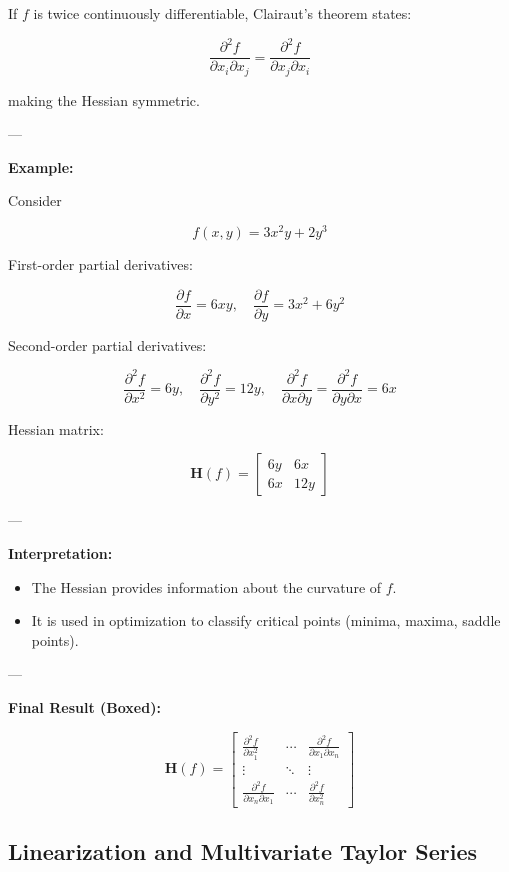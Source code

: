 If \( f \) is twice continuously differentiable, Clairaut's theorem states:

\[
\frac{\partial^2 f}{\partial x_i \partial x_j} = \frac{\partial^2 f}{\partial x_j \partial x_i}
\]

making the Hessian symmetric.

---

\textbf{Example:}

Consider

\[
f(x, y) = 3x^2 y + 2 y^3
\]

First-order partial derivatives:

\[
\frac{\partial f}{\partial x} = 6 x y, \quad \frac{\partial f}{\partial y} = 3 x^2 + 6 y^2
\]

Second-order partial derivatives:

\[
\frac{\partial^2 f}{\partial x^2} = 6 y, \quad \frac{\partial^2 f}{\partial y^2} = 12 y, \quad \frac{\partial^2 f}{\partial x \partial y} = \frac{\partial^2 f}{\partial y \partial x} = 6 x
\]

Hessian matrix:

\[
\mathbf{H}(f) =
\begin{bmatrix}
6 y & 6 x \\
6 x & 12 y
\end{bmatrix}
\]

---

\textbf{Interpretation:}
\begin{itemize}
    \item The Hessian provides information about the curvature of \( f \).
    \item It is used in optimization to classify critical points (minima, maxima, saddle points).
\end{itemize}

---

\textbf{Final Result (Boxed):}

\[
\boxed{
\mathbf{H}(f) =
\begin{bmatrix}
\frac{\partial^2 f}{\partial x_1^2} & \cdots & \frac{\partial^2 f}{\partial x_1 \partial x_n} \\
\vdots & \ddots & \vdots \\
\frac{\partial^2 f}{\partial x_n \partial x_1} & \cdots & \frac{\partial^2 f}{\partial x_n^2}
\end{bmatrix}
}
\]


\subsection{Linearization and Multivariate Taylor Series}

